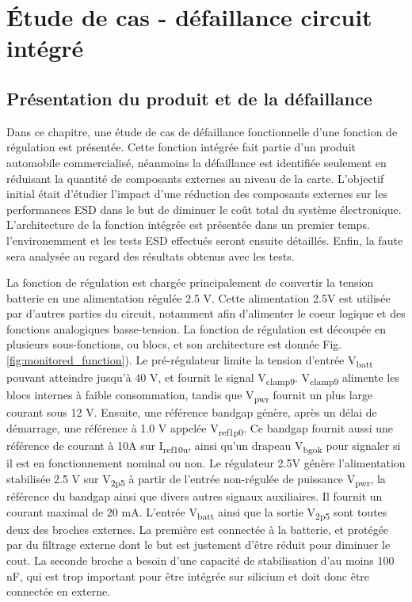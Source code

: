 \chapter{Étude de cas - défaillance circuit intégré}
\label{chap:3}
\section{Présentation du produit et de la défaillance}

Dans ce chapitre, une étude de cas de défaillance fonctionnelle d'une fonction de régulation est présentée.
Cette fonction intégrée fait partie d'un produit automobile commercialisé, néanmoins la défaillance est identifiée seulement en réduisant la quantité de composants externes au niveau de la carte.
L'objectif initial était d'étudier l'impact d'une réduction des composants externes sur les performances ESD dans le but de diminuer le coût total du système électronique.
L'architecture de la fonction intégrée est présentée dans un premier temps.
l'environemment et les tests ESD effectués seront ensuite détaillés.
Enfin, la faute sera analysée au regard des résultats obtenus avec les tests.

La fonction de régulation est chargée principalement de convertir la tension batterie en une alimentation régulée 2.5 V.
Cette alimentation 2.5V est utilisée par d'autres parties du circuit, notamment afin d'alimenter le coeur logique et des fonctions analogiques basse-tension.
La fonction de régulation est découpée en plusieurs sous-fonctions, ou blocs, et son architecture est donnée Fig. \ref{fig:monitored_function}).
Le pré-régulateur limite la tension d'entrée V\textsubscript{batt} pouvant atteindre jusqu'à 40 V, et fournit le signal V\textsubscript{clamp9}.
V\textsubscript{clamp9} alimente les blocs internes à faible consommation, tandis que V\textsubscript{pwr} fournit un plus large courant sous 12 V.
Ensuite, une référence bandgap génère, après un délai de démarrage, une référence à 1.0 V appelée V\textsubscript{ref1p0}.
Ce bandgap fournit aussi une référence de courant à 10\textMu{}A sur I\textsubscript{ref10u}, ainsi qu'un drapeau V\textsubscript{bgok} pour signaler si il est en fonctionnement nominal ou non.
Le régulateur 2.5V génère l'alimentation stabilisée 2.5 V sur V\textsubscript{2p5} à partir de l'entrée non-régulée de puissance V\textsubscript{pwr}, la référence du bandgap ainsi que divers autres signaux auxiliaires.
Il fournit un courant maximal de 20 mA.
L'entrée V\textsubscript{batt} ainsi que la sortie V\textsubscript{2p5} sont toutes deux des broches externes.
La première est connectée à la batterie, et protégée par du filtrage externe dont le but est justement d'être réduit pour diminuer le cout.
La seconde broche a besoin d'une capacité de stabilisation d'au moins 100 nF, qui est trop important pour être intégrée sur silicium et doit donc être connectée en externe.

